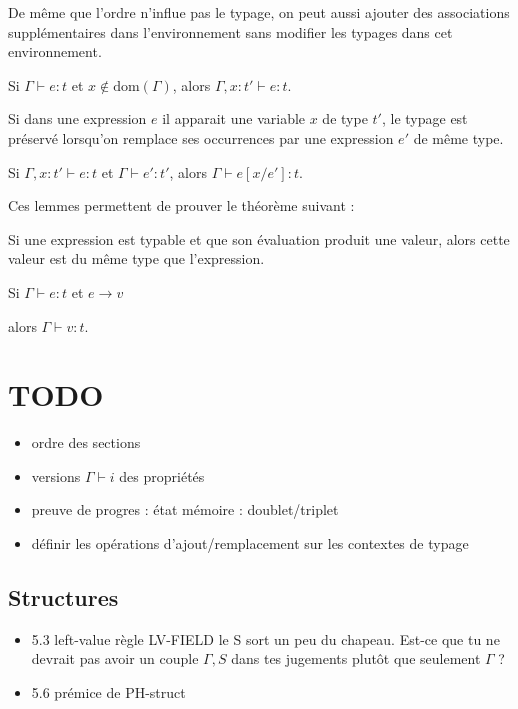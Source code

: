 \begin{lemma}[Affaiblissement]
  De même que l'ordre n'influe pas le typage, on peut aussi ajouter des
  associations supplémentaires dans l'environnement sans modifier les typages
  dans cet environnement.

  Si $Γ ⊢ e : t$ et $x ∉ \mathrm{dom}(Γ)$, alors $Γ, x : t' ⊢ e : t$.
\end{lemma}

\begin{lemma}[Substitution]
  Si dans une expression $e$ il apparait une variable $x$ de type $t'$, le
  typage est préservé lorsqu'on remplace ses occurrences par une expression $e'$
  de même type.

  Si $Γ, x : t' ⊢ e : t$ et $Γ ⊢ e' : t'$, alors $Γ ⊢ e [x/e'] : t$.
\end{lemma}

Ces lemmes permettent de prouver le théorème suivant :

\begin{theorem}[Préservation]
  \label{thm:preservation}

  Si une expression est typable et que son évaluation produit une valeur, alors
  cette valeur est du même type que l'expression.

  Si $Γ ⊢ e : t$ et $e → v$ %

  alors $Γ ⊢ v : t$.

\end{theorem}

\section*{TODO}

\begin{itemize}
\item ordre des sections
\item versions $Γ ⊢ i$ des propriétés
\item preuve de progres : état mémoire : doublet/triplet
\item définir les opérations d'ajout/remplacement sur les contextes de typage
\end{itemize}

\subsection*{Structures}

\begin{itemize}
\item
  5.3 left-value règle LV-FIELD le S sort un peu du chapeau. Est-ce que
  tu ne devrait pas avoir un couple $\Gamma, S$ dans tes jugements plutôt
  que seulement $\Gamma$ ?
\item
  5.6 prémice de PH-struct
\end{itemize}

